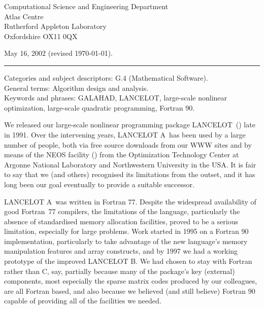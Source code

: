 \documentclass[twoside]{article}
\newcommand{\gal}{{\sf GALAHAD}}
\newcommand{\lan}{{\sf LANCELOT}}
\newcommand{\lana}{{\sf LANCELOT A}}
\newcommand{\lanb}{{\sf LANCELOT B}}
\begin{document}
\begin{titlepage}
\vspace{0.6 cm}

\noindent
Computational Science and Engineering Department
\\
Atlas Centre
\\
Rutherford Appleton Laboratory
\\
Oxfordshire OX11 0QX

\vspace{0.1 cm}
\noindent May 16, 2002 \hspace*{0.01cm} (revised \today).
\vspace{0.5 cm}

\noindent \rule{\textwidth}{0.001in}

\vspace{0.2 cm}
\noindent
Categories and subject descriptors: G.4 (Mathematical Software). \\
General terms: Algorithm design and analysis. \\
Keywords and phrases: \gal, \lan, large-scale nonlinear optimization,
large-scale quadratic programming,
Fortran 90.

\end{titlepage}




\setcounter{page}{1}

We released our large-scale nonlinear programming package \lan\
() late in 1991. Over the intervening
years, \lana\ has been used by a large number of people, both
via free source downloads from our WWW sites
and by means of the NEOS facility ()
from the Optimization Technology Center at
Argonne National Laboratory and Northwestern University in the USA.
It is fair to say that we (and others) recognised its limitations
from the outset, and it has long been our goal eventually to provide
a suitable successor.

\lana\ was written in Fortran 77.
Despite the widespread availability of good
Fortran~77 compilers, the limitations of the language, particularly
the absence of standardised memory allocation facilities, proved to be
a serious limitation, especially for large problems.
Work started in 1995 on a Fortran 90 implementation,
particularly to take advantage of the new language's
memory manipulation features and array constructs, and by 1997 we had a
working prototype of the improved \lanb. We had chosen to stay with
Fortran rather than C, say, partially because many of the package's
key (external) components, most especially the \citebb{hsl:2002}
sparse matrix codes
produced by our colleagues, are all Fortran based, and also because
we believed (and still believe) Fortran 90 capable of providing
all of the facilities we needed.
\end{document}
